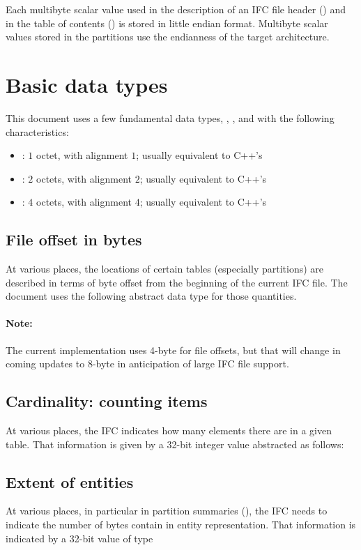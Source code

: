 Each multibyte scalar value used in the description of an IFC file header ()
and in the table of contents ()
is stored in little endian format. Multibyte scalar values stored in the partitions use the
endianness of the target architecture.

\section{Basic data types}
\label{sec:ifc-basic-data-types}

This document uses a few fundamental data types, , , and  with the following characteristics:
\begin{itemize}
	\item {}: $1$ octet, with alignment $1$; usually equivalent to C++'s 
	\item {}: $2$ octets, with alignment $2$; usually equivalent to C++'s 
	\item {}: $4$ octets, with alignment $4$; usually equivalent to C++'s  
\end{itemize} 

\subsection{File offset in bytes}
At various places, the locations of certain tables (especially partitions) are
described in terms of byte offset from the beginning of the current IFC file.  The
document uses the following abstract data type for those quantities.

\paragraph{Note:}
The current implementation uses 4-byte for file offsets, but that will change
in coming updates to 8-byte in anticipation of large IFC file support.

\subsection{Cardinality: counting items}
At various places, the IFC indicates how many elements there are in a given
table.  That information is given by a 32-bit integer value abstracted as
follows: 

\subsection{Extent of entities}
\label{sec:ifc-entity-size}
At various places, in particular in partition summaries (), the IFC needs to indicate 
the number of bytes contain in entity representation.  That information is
indicated by a 32-bit value of type 

